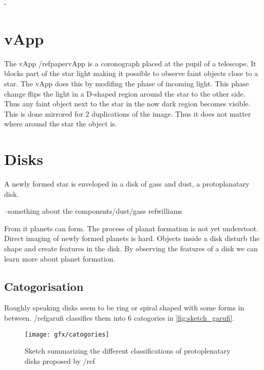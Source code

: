 


-

\section{vApp}

The vApp /ref{papervApp} is a coronograph placed at the pupil of a telescope. It blocks part of the star light making it possible to observe faint objects close to a star. The vApp does this by modifing the phase of incoming light. This phase change flips the light in a D-shaped region around the star to the other side. Thus any faint object next to the star in the now dark region becomes visible. This is done mirrored for 2 duplications of the image. Thus it does not matter where around the star the object is.







\section{Disks} %
\label{sec:disks} %

A newly formed star is enveloped in a disk of gass and dust, a protoplanatary disk.

--something about the components/dust/gass ref{williams}

From it planets can form. The process of planat formation is not yet understoot. Direct imaging of newly formed planets is hard. Objects inside a disk disturb the shape and create features in the disk. By observing the features of a disk we can learn more about planet formation.

\subsection{Catogorisation}

Roughly speaking disks seem to be ring or spiral shaped with some forms in between. /ref{garufi} classifies them into 6 catogories in \autoref{fig:sketch_garufi}. 

\begin{figure}[h]
    \label{fig:sketch_garufi}
    \caption{Sketch summarizing the different classifications of protoplenatary disks proposed by /ref}
    \centering
    \texttt{[image: gfx/catogories]}
\end{figure}

